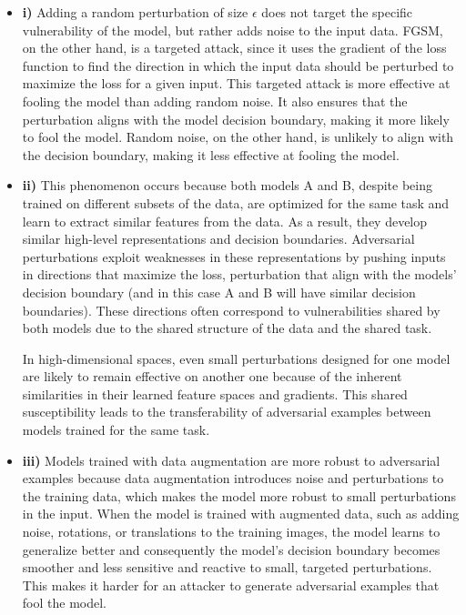 \documentclass{article}
\begin{document}
\begin{itemize}
    \item \textbf{i)} Adding a random perturbation of size $\epsilon$ does not target the specific vulnerability of the model, but rather adds noise to the input data. FGSM, on the other hand, is a targeted attack, since it uses the gradient of the loss function to find the direction in which the input data should be perturbed to maximize the loss for a given input. This targeted attack is more effective at fooling the model than adding random noise. It also ensures that the perturbation aligns with the model decision boundary, making it more likely to fool the model. Random noise, on the other hand, is unlikely to align with the decision boundary, making it less effective at fooling the model.

    \item \textbf{ii)} This phenomenon occurs because both models A and B, despite being trained on different subsets of the data, are optimized for the same task and learn to extract similar features from the data. As a result, they develop similar high-level representations and decision boundaries. Adversarial perturbations exploit weaknesses in these representations by pushing inputs in directions that maximize the loss, perturbation that align with the models' decision boundary (and in this case A and B will have similar decision boundaries). These directions often correspond to vulnerabilities shared by both models due to the shared structure of the data and the shared task.

    In high-dimensional spaces, even small perturbations designed for one model are likely to remain effective on another one because of the inherent similarities in their learned feature spaces and gradients. This shared susceptibility leads to the transferability of adversarial examples between models trained for the same task.

    \item \textbf{iii)} Models trained with data augmentation are more robust to adversarial examples because data augmentation introduces noise and perturbations to the training data, which makes the model more robust to small perturbations in the input. When the model is trained with augmented data, such as adding noise, rotations, or translations to the training images, the model learns to generalize better and consequently the model's decision boundary becomes smoother and less sensitive and reactive to small, targeted perturbations. This makes it harder for an attacker to generate adversarial examples that fool the model.
\end{itemize}
\end{document}

